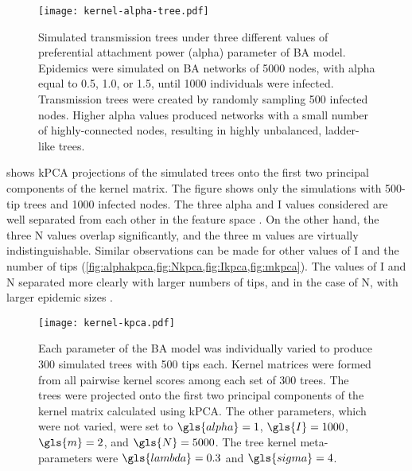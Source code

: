 \begin{figure}[ht]
    \centering
    \texttt{[image: kernel-alpha-tree.pdf]}
    \caption[
        Simulated transmission trees under three different values of
        preferential attachment power (\gls{alpha}) parameter of \acrshort{BA}
        model.
    ]{
        Simulated transmission trees under three different values of
        preferential attachment power (\gls{alpha}) parameter of \acrshort{BA}
        model. Epidemics were simulated on \gls{BA} networks of 5000 nodes,
        with \gls{alpha} equal to 0.5, 1.0, or 1.5, until 1000 individuals were
        infected. Transmission trees were created by randomly sampling 500
        infected nodes. Higher \gls{alpha} values produced networks with a
        small number of highly-connected nodes, resulting in highly unbalanced,
        ladder-like trees.
    }
  \label{fig:alphatrees}
\end{figure}

 shows \gls{kPCA} projections of the simulated trees onto the
first two principal components of the kernel matrix. The figure shows only the
simulations with 500-tip trees and 1000 infected nodes. The three \gls{alpha}
and \gls{I} values considered are well separated from each other in the feature
space . On the other hand, the three \gls{N}
values overlap significantly, and the three \gls{m} values are virtually
indistinguishable. Similar observations can be made for other values of \gls{I}
and the number of tips (\cref{fig:alphakpca,fig:Nkpca,fig:Ikpca,fig:mkpca}).
The values of \gls{I} and \gls{N} separated more clearly with larger numbers of
tips, and in the case of \gls{N}, with larger epidemic sizes
.

\begin{figure}[ht]
    \centering
    \texttt{[image: kernel-kpca.pdf]}
    \caption[
        Kernel-\gls{PCA} projections of simulated trees under varying \gls{BA}
        parameter values.
    ]{
        Each parameter of the \gls{BA} model was individually varied to produce
        300 simulated trees with 500 tips each. Kernel matrices were formed
        from all pairwise kernel scores among each set of 300 trees. The trees
        were projected onto the first two principal components of the kernel
        matrix calculated using \gls{kPCA}. The other parameters, which were
        not varied, were set to $\gls{alpha} = 1$, $\gls{I} = 1000$, $\gls{m} =
        2$, and $\gls{N} = 5000$. The tree kernel meta-parameters were
        $\gls{lambda} = 0.3$ and $\gls{sigma} = 4$.
  }
  \label{fig:kpca}
\end{figure}



